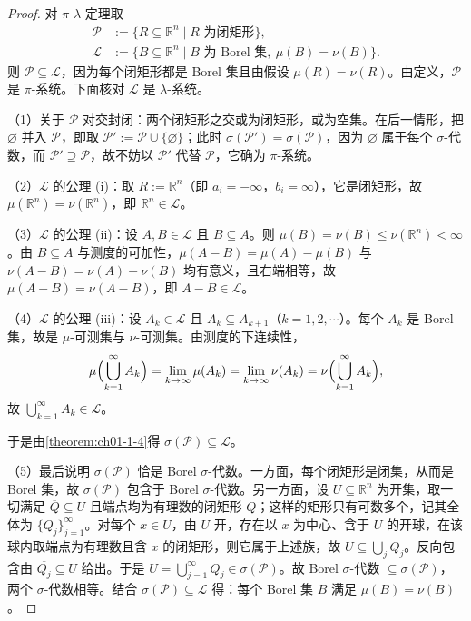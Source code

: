 \documentclass[../../main.tex]{subfiles}
\begin{document}
\begin{proof}
对 $\pi$-$\lambda$ 定理取
\begin{align*}
\mathcal{P}&:=\{R\subseteq\mathbb{R}^{n}\mid R\text{ 为闭矩形}\},\\
\mathcal{L}&:=\{B\subseteq\mathbb{R}^{n}\mid B\text{ 为 Borel 集},\ \mu(B)=\nu(B)\}.
\end{align*}
则 $\mathcal{P}\subseteq\mathcal{L}$，因为每个闭矩形都是 Borel 集且由假设 $\mu(R)=\nu(R)$。由定义，$\mathcal{P}$ 是 $\pi$-系统。下面核对 $\mathcal{L}$ 是 $\lambda$-系统。

（1）关于 $\mathcal{P}$ 对交封闭：两个闭矩形之交或为闭矩形，或为空集。在后一情形，把 $\varnothing$ 并入 $\mathcal{P}$，即取 $\mathcal{P}':=\mathcal{P}\cup\{\varnothing\}$；此时 $\sigma(\mathcal{P}')=\sigma(\mathcal{P})$，因为 $\varnothing$ 属于每个 $\sigma$-代数，而 $\mathcal{P}'\supseteq\mathcal{P}$，故不妨以 $\mathcal{P}'$ 代替 $\mathcal{P}$，它确为 $\pi$-系统。

（2）$\mathcal{L}$ 的公理 (i)：取 $R:=\mathbb{R}^{n}$（即 $a_{i}=-\infty$，$b_{i}=\infty$），它是闭矩形，故 $\mu(\mathbb{R}^{n})=\nu(\mathbb{R}^{n})$，即 $\mathbb{R}^{n}\in\mathcal{L}$。

（3）$\mathcal{L}$ 的公理 (ii)：设 $A,B\in\mathcal{L}$ 且 $B\subseteq A$。则 $\mu(B)=\nu(B)\leqslant\nu(\mathbb{R}^{n})<\infty$。由 $B\subseteq A$ 与测度的可加性，$\mu(A-B)=\mu(A)-\mu(B)$ 与 $\nu(A-B)=\nu(A)-\nu(B)$ 均有意义，且右端相等，故 $\mu(A-B)=\nu(A-B)$，即 $A-B\in\mathcal{L}$。

（4）$\mathcal{L}$ 的公理 (iii)：设 $A_{k}\in\mathcal{L}$ 且 $A_{k}\subseteq A_{k+1}$（$k=1,2,\cdots$）。每个 $A_{k}$ 是 Borel 集，故是 $\mu$-可测集与 $\nu$-可测集。由测度的下连续性，
\begin{align*}
\mu\Bigl(\bigcup_{k=1}^{\infty}A_{k}\Bigr)=\lim_{k\to\infty}\mu(A_{k})=\lim_{k\to\infty}\nu(A_{k})=\nu\Bigl(\bigcup_{k=1}^{\infty}A_{k}\Bigr),
\end{align*}
故 $\bigcup_{k=1}^{\infty}A_{k}\in\mathcal{L}$。

于是由\cref{theorem:ch01-1-4}得 $\sigma(\mathcal{P})\subseteq\mathcal{L}$。%

（5）最后说明 $\sigma(\mathcal{P})$ 恰是 Borel $\sigma$-代数。一方面，每个闭矩形是闭集，从而是 Borel 集，故 $\sigma(\mathcal{P})$ 包含于 Borel $\sigma$-代数。另一方面，设 $U\subseteq\mathbb{R}^{n}$ 为开集，取一切满足 $\overline{Q}\subseteq U$ 且端点均为有理数的闭矩形 $Q$；这样的矩形只有可数多个，记其全体为 $\{Q_{j}\}_{j=1}^{\infty}$。对每个 $x\in U$，由 $U$ 开，存在以 $x$ 为中心、含于 $U$ 的开球，在该球内取端点为有理数且含 $x$ 的闭矩形，则它属于上述族，故 $U\subseteq\bigcup_{j}Q_{j}$。反向包含由 $\overline{Q_{j}}\subseteq U$ 给出。于是 $U=\bigcup_{j=1}^{\infty}Q_{j}\in\sigma(\mathcal{P})$。故 Borel $\sigma$-代数 $\subseteq\sigma(\mathcal{P})$，两个 $\sigma$-代数相等。结合 $\sigma(\mathcal{P})\subseteq\mathcal{L}$ 得：每个 Borel 集 $B$ 满足 $\mu(B)=\nu(B)$。
\end{proof}
\end{document}
